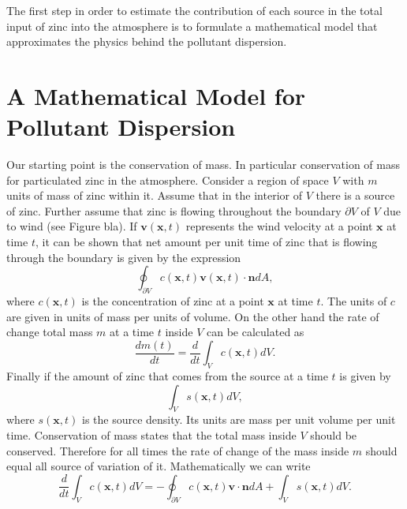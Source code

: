 \documentclass[12pt]{book}
\newcommand{\x}{\textbf{x}}
\newcommand{\vv}{\textbf{v}}
\begin{document}
The first step in order to estimate the contribution of each source in the total
input of zinc into the atmosphere is to formulate a mathematical model that approximates
the physics behind the pollutant dispersion.




\section{A Mathematical Model for Pollutant Dispersion}
Our starting point  is the conservation of mass. In particular conservation of mass for
particulated zinc in the atmosphere. Consider a region of space  $V$ with $m$ units of   mass
of zinc within it. 
Assume
that in the interior of $V$ there is  a source of  zinc. Further assume that zinc is flowing throughout 
the boundary $\partial V$ of $V$  due to  wind (see Figure bla).
If $\vv(\x,t)$ represents the wind velocity at a point $\x$ at time $t$, it can be shown that net amount
per unit time of zinc that is flowing through the boundary is given by the expression
\cite{seinfeld1998atmospheric}
\begin{equation*}
\oint_{\partial V}c(\x,t)\vv(\x,t)\cdot\textbf{n}dA,
\end{equation*}
where  $c(\x,t)$ is the concentration of zinc at a point $\x$
at time $t$.
The units of $c$ are given in units of mass per units of volume. On the other hand
the rate of change total mass $m$ at a time $t$ inside $V$  can be calculated as
\begin{equation*}
\frac{dm(t)}{dt}=\frac{d}{dt}\int_{V}c(\x,t)dV.
\end{equation*}
Finally if the amount of zinc that comes from the source at a time $t$ is given by
\begin{equation*}
\int_{V}s(\x,t)dV,
\end{equation*}
where $s(\x,t)$ is the source density. Its units are mass per unit volume per unit time.
Conservation of mass states that the total mass inside $V$ should be conserved. Therefore
for all times the rate of change of the mass inside $m$ should equal all source of variation of it.
Mathematically we can write
\begin{equation*}
\frac{d}{dt}\int_{V}c(\x,t)dV=-\oint_{\partial V}c(\x,t)\textbf{v}\cdot\textbf{n}dA+\int_{V}s(\x,t)dV.
\end{equation*}
\end{document}

